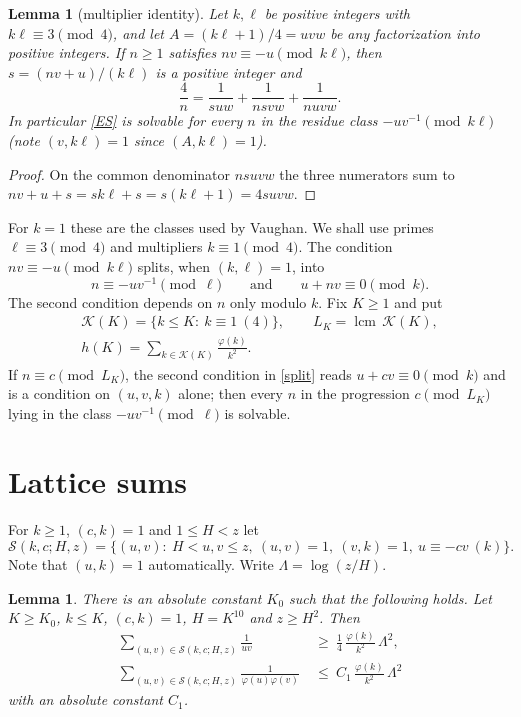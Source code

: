 \documentclass[11pt,reqno]{amsart}
\newtheorem{lemma}[theorem]{Lemma}
\newcommand{\lcm}{\operatorname{lcm}}
\newcommand{\cS}{\mathcal S}
\newcommand{\cK}{\mathcal K}
\begin{document}
\begin{lemma}[multiplier identity]\label{lem:identity}
Let $k,\ell$ be positive integers with $k\ell\equiv3\pmod 4$, and let
$A=(k\ell+1)/4=uvw$ be any factorization into positive integers.  If $n\ge1$
satisfies $nv\equiv-u\pmod{k\ell}$, then $s=(nv+u)/(k\ell)$ is a positive
integer and
\[
 \frac4n=\frac1{suw}+\frac1{nsvw}+\frac1{nuvw}.
\]
In particular \eqref{ES} is solvable for every $n$ in the residue class
$-uv^{-1}\pmod{k\ell}$ (note $(v,k\ell)=1$ since $(A,k\ell)=1$).
\end{lemma}

\begin{proof}
On the common denominator $nsuvw$ the three numerators sum to
$nv+u+s=sk\ell+s=s(k\ell+1)=4suvw$.
\end{proof}

For $k=1$ these are the classes used by Vaughan.  We shall use primes
$\ell\equiv3\pmod4$ and multipliers $k\equiv1\pmod4$.  The condition
$nv\equiv-u\pmod{k\ell}$ splits, when $(k,\ell)=1$, into
\begin{equation}\label{split}
 n\equiv-uv^{-1}\pmod\ell\qquad\text{and}\qquad u+nv\equiv0\pmod k .
\end{equation}
The second condition depends on $n$ only modulo $k$.  Fix $K\ge1$ and put
\[
 \begin{gathered}
 \cK(K)=\{k\le K:\ k\equiv1\ (4)\},\qquad L_K=\lcm\,\cK(K),\\
 h(K)=\sum_{k\in\cK(K)}\frac{\varphi(k)}{k^2}.
 \end{gathered}
\]
If $n\equiv c\pmod{L_K}$, the second condition in \eqref{split} reads
$u+cv\equiv0\pmod k$ and is a condition on $(u,v,k)$ alone; then every $n$ in
the progression $c\pmod{L_K}$ lying in the class $-uv^{-1}\pmod\ell$ is
solvable.

\section{Lattice sums}\label{sec:lattice}

For $k\ge1$, $(c,k)=1$ and $1\le H<z$ let
\[
 \cS(k,c;H,z)=\{(u,v):\ H<u,v\le z,\ (u,v)=1,\ (v,k)=1,\ u\equiv-cv\ (k)\}.
\]
Note that $(u,k)=1$ automatically.  Write $\Lambda=\log(z/H)$.

\begin{lemma}\label{lem:lattice}
There is an absolute constant $K_0$ such that the following holds.  Let $K\ge K_0$, $k\le K$, $(c,k)=1$, $H=K^{10}$ and $z\ge H^2$.  Then
\begin{align}
 \sum_{(u,v)\in\cS(k,c;H,z)}\frac1{uv}&\ \ge\ \frac1{4}\,\frac{\varphi(k)}{k^2}\,\Lambda^2,
 \label{lat-lower}\\
 \sum_{(u,v)\in\cS(k,c;H,z)}\frac1{\varphi(u)\varphi(v)}&\ \le\ C_1\,\frac{\varphi(k)}{k^2}\,\Lambda^2
 \label{lat-upper}
\end{align}
with an absolute constant $C_1$.
\end{lemma}
\end{document}
